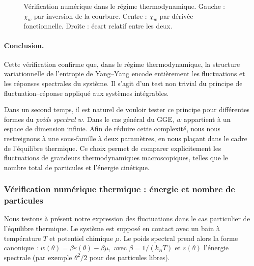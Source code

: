 \begin{figure}[H]
    \centering
    \caption{Vérification numérique dans le régime thermodynamique. Gauche : \(\chi_w\) par inversion de la courbure. Centre : \(\chi_w\) par dérivée fonctionnelle. Droite : écart relatif entre les deux.}
    \label{fig:chi_thermodynamique}
\end{figure}

\paragraph{Conclusion.} 
Cette vérification confirme que, dans le régime thermodynamique, la structure variationnelle de l’entropie de Yang–Yang encode entièrement les fluctuations et les réponses spectrales du système. Il s’agit d’un test non trivial du principe de fluctuation–réponse appliqué aux systèmes intégrables.

\medskip

Dans un second temps, il est naturel de vouloir tester ce principe pour différentes formes du {\em poids spectral} $w$. Dans le cas général du GGE, $w$ appartient à un espace de dimension infinie. Afin de réduire cette complexité, nous nous restreignons à une sous-famille à deux paramètres, en nous plaçant dans le cadre de l’équilibre thermique. Ce choix permet de comparer explicitement les fluctuations de grandeurs thermodynamiques macroscopiques, telles que le nombre total de particules et l’énergie cinétique.





\subsubsection{Vériﬁcation numérique thermique :  énergie et nombre de particules}

Nous testons à présent notre expression des fluctuations dans le cas particulier de l'équilibre thermique. Le système est supposé en contact avec un bain à température \( T \) et potentiel chimique \( \mu \). Le poids spectral prend alors la forme canonique :
\(
w(\theta) = \beta \varepsilon(\theta) - \beta \mu,
\)
avec \( \beta = 1 / (k_B T) \) et \( \varepsilon(\theta) \) l’énergie spectrale (par exemple \( \theta^2/2 \) pour des particules libres).

